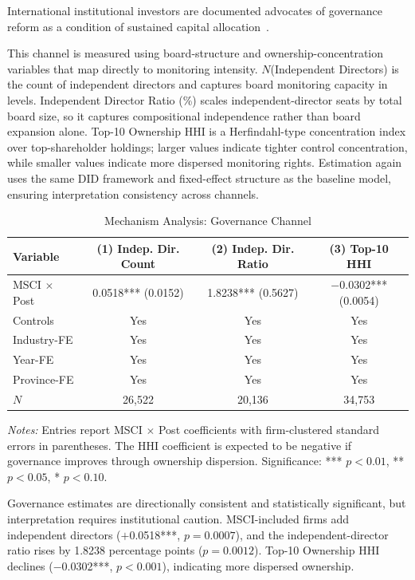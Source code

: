 International institutional investors are documented advocates of governance reform as a condition of sustained capital allocation~\cite{Aggarwal2011}.

This channel is measured using board-structure and ownership-concentration variables that map directly to monitoring intensity. $N$(Independent Directors) is the count of independent directors and captures board monitoring capacity in levels. Independent Director Ratio (\%) scales independent-director seats by total board size, so it captures compositional independence rather than board expansion alone. Top-10 Ownership HHI is a Herfindahl-type concentration index over top-shareholder holdings; larger values indicate tighter control concentration, while smaller values indicate more dispersed monitoring rights. Estimation again uses the same DID framework and fixed-effect structure as the baseline model, ensuring interpretation consistency across channels.

\begin{table}[htbp]
\centering
\caption{Mechanism Analysis: Governance Channel}
\label{tab:governance_channel}
\small
\begin{tabular}{lccc}
\toprule
\textbf{Variable} & \textbf{(1) Indep. Dir. Count} & \textbf{(2) Indep. Dir. Ratio} & \textbf{(3) Top-10 HHI} \\
\midrule
MSCI $\times$ Post & 0.0518*** (0.0152) & 1.8238*** (0.5627) & $-$0.0302*** (0.0054) \\
Controls & Yes & Yes & Yes \\
Industry-FE & Yes & Yes & Yes \\
Year-FE & Yes & Yes & Yes \\
Province-FE & Yes & Yes & Yes \\
$N$ & 26,522 & 20,136 & 34,753 \\
\bottomrule
\end{tabular}
\begin{tablenotes}
\small
\item \textit{Notes:} Entries report MSCI $\times$ Post coefficients with firm-clustered standard errors in parentheses. The HHI coefficient is expected to be negative if governance improves through ownership dispersion. Significance: *** $p < 0.01$, ** $p < 0.05$, * $p < 0.10$.
\end{tablenotes}
\end{table}

Governance estimates are directionally consistent and statistically significant, but interpretation requires institutional caution. MSCI-included firms add independent directors ($+$0.0518***, $p = 0.0007$), and the independent-director ratio rises by 1.8238 percentage points ($p = 0.0012$). Top-10 Ownership HHI declines ($-$0.0302***, $p < 0.001$), indicating more dispersed ownership.

